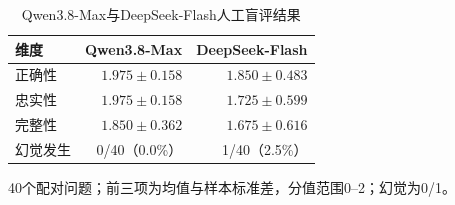 \begin{table}[htbp]
\centering\footnotesize
\setlength{\tabcolsep}{4pt}
\caption{Qwen3.8-Max与DeepSeek-Flash人工盲评结果}
\label{tab:cm-manual}
\begin{tabular}{lrr}
\toprule
维度 & Qwen3.8-Max & DeepSeek-Flash \\
\midrule
正确性 & $1.975 \pm 0.158$ & $1.850 \pm 0.483$ \\
忠实性 & $1.975 \pm 0.158$ & $1.725 \pm 0.599$ \\
完整性 & $1.850 \pm 0.362$ & $1.675 \pm 0.616$ \\
幻觉发生 & 0/40（0.0\%） & 1/40（2.5\%） \\
\bottomrule
\end{tabular}
\par\smallskip\raggedright 40个配对问题；前三项为均值与样本标准差，分值范围0--2；幻觉为0/1。
\end{table}
